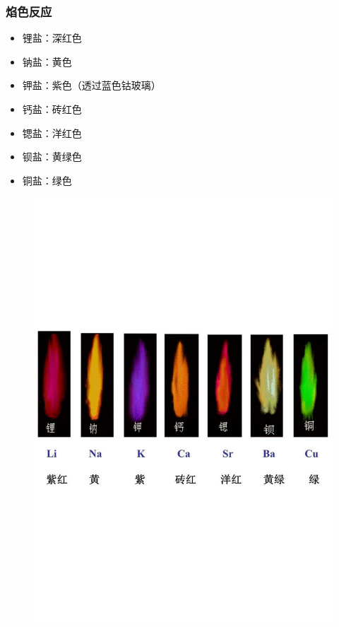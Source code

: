 \documentclass[a4paper]{article}
\begin{document}
	\subsubsection{焰色反应}
	\begin{itemize}
		\item 锂盐：\textcolor[rgb]{0.698,0.149,0.098}{深红色}
		\item 钠盐：\textcolor[rgb]{0.964,0.913,0.313}{黄色}
		\item 钾盐：\textcolor[rgb]{0.882,0.741,0.858}{紫色}（透过蓝色钴玻璃）
		\item 钙盐：\textcolor[rgb]{0.886,0.529,0.215}{砖红色}
		\item 锶盐：\textcolor[rgb]{0.698,0.152,0.107}{洋红色}
		\item 钡盐：\textcolor[rgb]{0.788,0.835,0.286}{黄绿色}
		\item 铜盐：\textcolor[rgb]{0.537,0.8,0.262}{绿色}
	\end{itemize}
	\begin{figure}[h]
	\centering
	\includegraphics[scale=0.5]{res/FlameTest.pdf}
	\end{figure}
	
\end{document}
